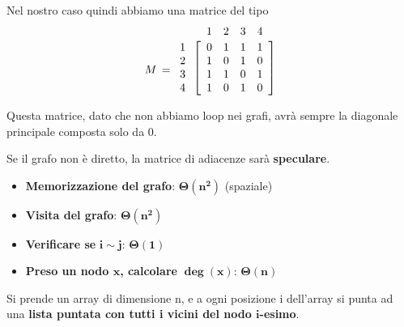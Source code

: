 \documentclass[11pt, a4paper, titlepage, oneside]{scrbook}
\begin{document}
Nel nostro caso quindi abbiamo una matrice del tipo 
\[
\raisebox{-0.9em}{$M \,=\,$}\,
\begin{array}{@{}c@{\hspace{2pt}}c@{}}
   & \begin{array}{cccc} 1 & 2 & 3 & 4 \end{array} \\[2pt]
  \begin{array}{c} 1\\2\\3\\4 \end{array}
  &
  \left[
  \begin{array}{cccc}
    0 & 1 & 1 & 1 \\
    1 & 0 & 1 & 0 \\
    1 & 1 & 0 & 1 \\
    1 & 0 & 1 & 0
  \end{array}
  \right]
\end{array}
\]

Questa matrice, dato che non abbiamo loop nei grafi, avrà sempre la diagonale principale composta solo da 0.

\begin{Proposizione}[]
\label{propos-matrice-speculare}
Se il grafo non è diretto, la matrice di adiacenze sarà \textbf{speculare}.
\end{Proposizione}

\begin{Proprieta}
\label{prop-costi-matrice-adiacenze}
\begin{itemize}
    \item \textbf{Memorizzazione del grafo}: $\bm{\Theta(n^2)}$ (spaziale)
    \item \textbf{Visita del grafo}: $\bm{\Theta(n^2)}$ 
    \item \textbf{Verificare se} $\bm{i \sim j}$: $\bm{\Theta(1)}$
    \item \textbf{Preso un nodo $\bm{x}$, calcolare} $\bm{\deg(x)}$: $\bm{\Theta(n)}$
\end{itemize}
\end{Proprieta}

\begin{Definizione}
\label{def-lista-adiacenze}
Si prende un array di dimensione n, e a ogni posizione i dell'array si punta ad una \textbf{lista puntata con tutti i vicini del nodo $\bm{i}$-esimo}.
\end{Definizione}
\end{document}
